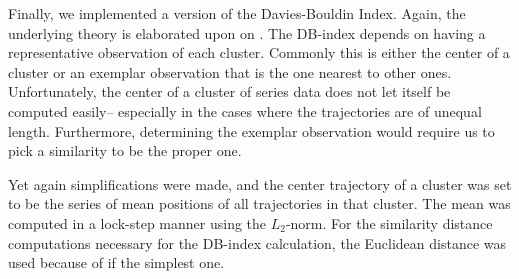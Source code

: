 Finally, we implemented a version of the Davies-Bouldin Index. 
Again, the underlying theory is elaborated upon on . 
The DB-index depends on having a representative observation of each cluster. 
Commonly this is either the center of a cluster or an exemplar observation that is the one nearest to other ones. 
Unfortunately, the center of a cluster of series data does not let itself be computed easily– especially in the cases where the trajectories are of unequal length. Furthermore, determining the exemplar observation would require us to pick a similarity to be the proper one.   

Yet again simplifications were made, and the center trajectory of a cluster was set to be the series of mean positions of all trajectories in that cluster.
The mean was computed in a lock-step manner using the $L_2$-norm. 
For the similarity distance computations necessary for the DB-index calculation, the Euclidean distance was used because of if the simplest one. 





												





 




